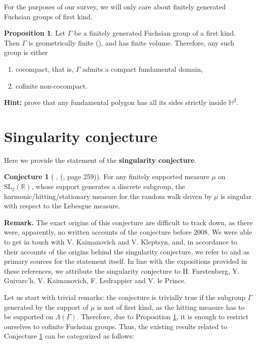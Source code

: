 \documentclass[11pt]{amsart}
\theoremstyle{definition}
\newtheorem{proposition}{Proposition}[section]
\newtheorem{conjecture}{Conjecture}[section]
\begin{document}
		For the purposes of our survey, we will only care about finitely generated Fuchsian groups of first kind.
		
		
		\begin{proposition}
			\label{classification of first kind}
			Let $\Gamma$ be a finitely generated Fuchsian group of a first kind. Then $\Gamma$ is geometrically finite (\cite[Theorem 4.6.1]{book:291162}), and has finite volume. Therefore, any such group is either
			\begin{enumerate}
				\item cocompact, that is, $\Gamma$ admits a compact fundamental domain,
				\item cofinite non-cocompact.
			\end{enumerate} 
		\end{proposition}
		\textbf{Hint:} prove that any fundamental polygon has all its sides strictly inside $\mathbb{H}^2$.
			
			
	\section{Singularity conjecture}
	
	Here we provide the statement of the \textbf{singularity conjecture}.
	\begin{conjecture}[ \cite{MR2568439}, (\cite{kaimanovich2011matrix}, page 259)]
		\label{Fuchsian singularity conjecture}
		For any finitely supported measure $\mu$ on $\text{SL}_2(\mathbb{R})$, whose support generates a discrete subgroup, the harmonic/hitting/stationary measure for the random walk driven by $\mu$ is singular with respect to the Lebesgue measure.
	\end{conjecture}
	
	\textbf{Remark.} The exact origins of this conjecture are difficult to track down, as there were, apparently, no written accounts of the conjecture before 2008. We were able to get in touch with V. Kaimanovich and V. Kleptsyn, and, in accordance to their accounts of the origins behind the singularity conjecture, we refer to \cite{MR2568439} and \cite{kaimanovich2011matrix} as primary sources for the statement itself. In line with the expositions provided in these references, we attribute the singularity conjecture to H. Furstenberg, Y. Guivarc'h, V. Kaimanovich, F. Ledrappier and V. le Prince. 
	
	Let us start with trivial remarks: the conjecture is trivially true if the subgroup $\Gamma$ generated by the support of $\mu$ is not of first kind, as the hitting measure has to be supported on $\Lambda(\Gamma)$. Therefore, due to Proposition \ref{classification of first kind}, it is enough to restrict ourselves to cofinite Fuchsian groups. Thus, the existing results related to Conjecture \ref{Fuchsian singularity conjecture} can be categorized as follows:
	
\end{document}
